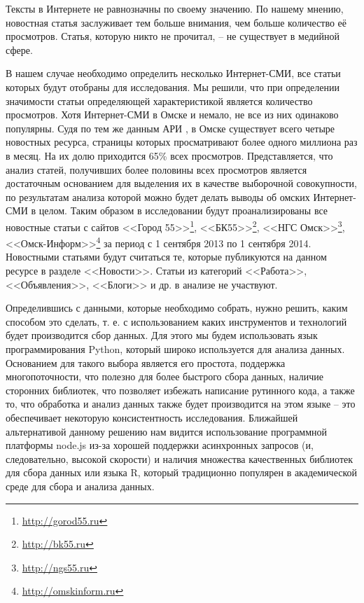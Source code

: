 Тексты в Интернете не равнозначны по своему значению. По нашему мнению, новостная статья заслуживает тем больше внимания, чем больше количество её просмотров. Статья, которую никто не прочитал, -- не существует в медийной сфере. %

В нашем случае необходимо определить несколько Интернет-СМИ, все статьи которых будут отобраны для исследования. Мы решили, что при определении значимости статьи определяющей характеристикой является количество просмотров. Хотя Интернет-СМИ в Омске и немало, не все из них одинаково популярны. Судя по тем же данным АРИ \cite{ari_rating}, в Омске существует всего четыре новостных ресурса, страницы которых просматривают более одного миллиона раз в месяц. На их долю приходится 65\% всех просмотров. Представляется, что анализ статей, получивших более половины всех просмотров является достаточным основанием для выделения их в качестве выборочной совокупности, по результатам анализа которой можно будет делать выводы об омских Интернет-СМИ в целом. Таким образом в исследовании будут проанализированы все новостные статьи с сайтов <<Город 55>>\footnote{\href{http://gorod55.ru}{http://gorod55.ru}}, <<БК55>>\footnote{\href{http://bk55.ru}{http://bk55.ru}}, <<НГС Омск>>\footnote{\href{http://ngs55.ru}{http://ngs55.ru}}, <<Омск-Информ>>\footnote{\href{http://omskinform.ru}{http://omskinform.ru}} за период с 1 сентября 2013 по 1 сентября 2014. Новостными статьями будут считаться те, которые публикуются на данном ресурсе в разделе <<Новости>>. Статьи из категорий <<Работа>>, <<Объявления>>, <<Блоги>> и др. в анализе не участвуют.

Определившись с данными, которые необходимо собрать, нужно решить, каким способом это сделать, т. е. с использованием каких инструментов и технологий будет производится сбор данных. Для этого мы будем использовать язык программирования Python, который широко используется для анализа данных. Основанием для такого выбора является его простота, поддержка многопоточности, что полезно для более быстрого сбора данных, наличие сторонних библиотек, что позволяет избежать написание рутинного кода, а также то, что обработка и анализ данных также будет производится на этом языке -- это обеспечивает некоторую консистентность исследования. Ближайшей альтернативой данному решению нам видится использование программной платформы node.js из-за хорошей поддержки асинхронных запросов (и, следовательно, высокой скорости) и наличия множества качественных библиотек для сбора данных или языка R, который традиционно популярен в академической среде для сбора и анализа данных.


